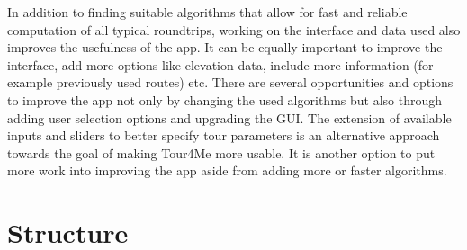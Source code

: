In addition to finding suitable algorithms that allow for fast and reliable computation of all typical roundtrips, working on the interface and data used also improves the usefulness of the app.
It can be equally important to improve the interface, add more options like elevation data, include more information (for example previously used routes) etc. 
There are several opportunities and options to improve the app not only by changing the used algorithms but also through adding user selection options and upgrading the GUI.
The extension of available inputs and sliders to better specify tour parameters is an alternative approach towards the goal of making Tour4Me more usable.
It is another option to put more work into improving the app aside from adding more or faster algorithms.




\section{Structure}
\label{sec:structure}


